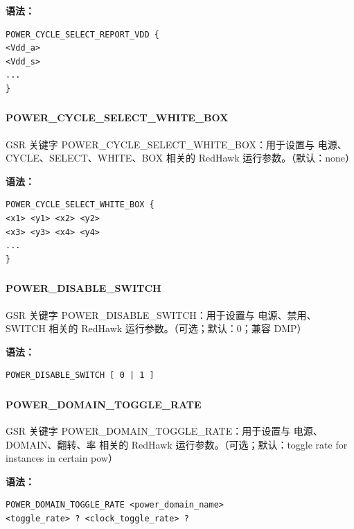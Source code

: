 \textbf{语法：}
\begin{lstlisting}
POWER_CYCLE_SELECT_REPORT_VDD {
<Vdd_a>
<Vdd_s>
...
}
\end{lstlisting}

\subsubsection{}
\paragraph*{POWER_CYCLE_SELECT_WHITE_BOX}

GSR 关键字 POWER_CYCLE_SELECT_WHITE_BOX：用于设置与 电源、CYCLE、SELECT、WHITE、BOX 相关的 RedHawk 运行参数。（默认：none）

\textbf{语法：}
\begin{lstlisting}
POWER_CYCLE_SELECT_WHITE_BOX {
<x1> <y1> <x2> <y2>
<x3> <y3> <x4> <y4>
...
}
\end{lstlisting}

\subsubsection{}
\paragraph*{POWER_DISABLE_SWITCH}

GSR 关键字 POWER_DISABLE_SWITCH：用于设置与 电源、禁用、SWITCH 相关的 RedHawk 运行参数。（可选；默认：0；兼容 DMP）

\textbf{语法：}
\begin{lstlisting}
POWER_DISABLE_SWITCH [ 0 | 1 ]
\end{lstlisting}

\subsubsection{}
\paragraph*{POWER_DOMAIN_TOGGLE_RATE}

GSR 关键字 POWER_DOMAIN_TOGGLE_RATE：用于设置与 电源、DOMAIN、翻转、率 相关的 RedHawk 运行参数。（可选；默认：toggle rate for instances in certain pow）

\textbf{语法：}
\begin{lstlisting}
POWER_DOMAIN_TOGGLE_RATE <power_domain_name>
<toggle_rate> ? <clock_toggle_rate> ?
\end{lstlisting}

